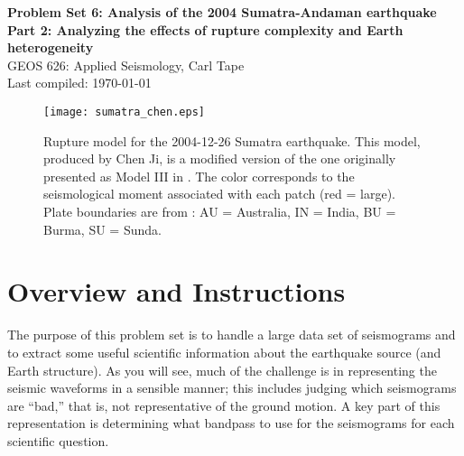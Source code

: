 \documentclass[11pt,titlepage,fleqn]{article}
\begin{document}

\begin{spacing}{1.2} 
\centering
{\large \bf Problem Set 6: Analysis of the 2004 Sumatra-Andaman earthquake \\
Part 2: Analyzing the effects of rupture complexity and Earth heterogeneity } \\
GEOS 626: Applied Seismology, Carl Tape \\
Last compiled: \today
\end{spacing}


\begin{figure}[h]
\centering
\texttt{[image: sumatra\_chen.eps]}
\caption[]
{{
Rupture model for the 2004-12-26  Sumatra earthquake.
This model, produced by Chen Ji, is a modified version of the one originally presented as Model III in \citet[][Figure~5c]{Ammon2005}.
The color corresponds to the seismological moment associated with each patch (red = large).
Plate boundaries are from \citet{Bird2003}: AU = Australia, IN = India, BU = Burma, SU = Sunda.
}}
\label{fig:sumatra_chen}
\end{figure}


\clearpage\pagebreak
\section*{Overview and Instructions}

The purpose of this problem set is to handle a large data set of seismograms and to extract some useful scientific information about the earthquake source (and Earth structure). As you will see, much of the challenge is in representing the seismic waveforms in a sensible manner; this includes judging which seismograms are ``bad,'' that is, not representative of the ground motion. A key part of this representation is determining what bandpass to use for the seismograms for each scientific question.
\end{document}
